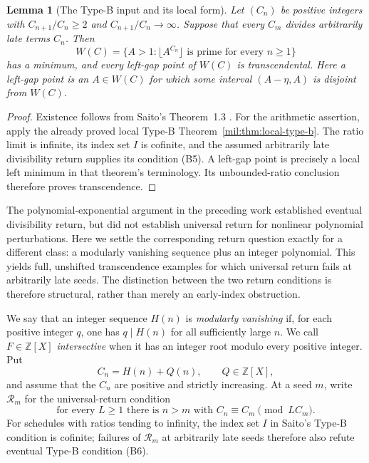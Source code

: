 \documentclass[11pt,a4paper]{article}
\newtheorem{lemma}[theorem]{Lemma}
\theoremstyle{definition}
\theoremstyle{remark}
\numberwithin{equation}{section}
\begin{document}
\begin{lemma}[The Type-B input and its local form]
\label{tw:lem:factorial-local-input}
Let $(C_n)$ be positive integers with $C_{n+1}/C_n\ge2$ and
$C_{n+1}/C_n\to\infty$.  Suppose that every $C_m$ divides
arbitrarily late terms $C_n$.  Then
\[
 W(C)=\{A>1:\lfloor A^{C_n}\rfloor\text{ is prime for every }n\ge1\}
\]
has a minimum, and every left-gap point of $W(C)$ is transcendental.
Here a left-gap point is an $A\in W(C)$ for which some interval
$(A-\eta,A)$ is disjoint from $W(C)$.
\end{lemma}
\begin{proof}
Existence follows from Saito's Theorem~1.3 \cite{SaitoVariants}.
For the arithmetic assertion, apply the already proved local Type-B
Theorem~\ref{mil:thm:local-type-b}. The ratio limit is infinite, its
index set $I$ is cofinite, and the assumed arbitrarily late divisibility
return supplies its condition (B5). A left-gap point is precisely a local
left minimum in that theorem's terminology. Its unbounded-ratio conclusion
therefore proves transcendence.
\end{proof}

The polynomial-exponential argument in the preceding work established
eventual divisibility return, but did not establish universal return for
nonlinear polynomial perturbations.  Here we settle the corresponding
return question exactly for a different class: a modularly vanishing
sequence plus an integer polynomial.  This yields full, unshifted
transcendence examples for which universal return fails at arbitrarily
late seeds.  The distinction between the two return conditions is therefore
structural, rather than merely an early-index obstruction.

We say that an integer sequence $H(n)$ is \emph{modularly vanishing} if,
for each positive integer $q$, one has $q\mid H(n)$ for all sufficiently
large $n$.  We call $F\in\mathbb Z[X]$ \emph{intersective} when it has an
integer root modulo every positive integer.  Put
\[
 C_n=H(n)+Q(n),\qquad Q\in\mathbb Z[X],
\]
and assume that the $C_n$ are positive and strictly increasing.  At a seed
$m$, write $\mathcal R_m$ for the universal-return condition
\[
 \text{for every }L\ge1\text{ there is }n>m
 \text{ with }C_n\equiv C_m\pmod{LC_m}.
\]
For schedules with ratios tending to infinity, the index set $I$ in
Saito's Type-B condition is cofinite; failures of $\mathcal R_m$ at
arbitrarily late seeds therefore also refute eventual Type-B condition
(B6).
\end{document}
